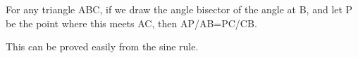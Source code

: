 For any triangle ABC, if we draw the angle bisector of the angle at B,
and let P be the point where this meets AC, then AP/AB=PC/CB.
\par
This can be proved easily from the sine rule.